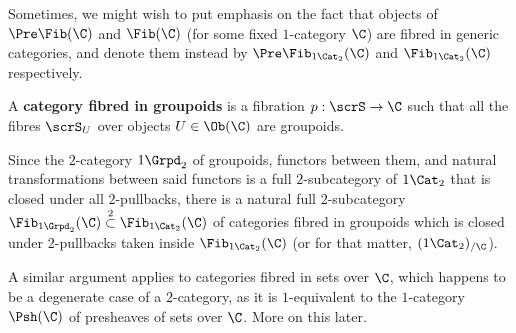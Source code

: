             \begin{convention}
                Sometimes, we might wish to put emphasis on the fact that objects of $\Pre\Fib(\C)$ and $\Fib(\C)$ (for some fixed $1$-category $\C$) are fibred in generic categories, and denote them instead by $\Pre\Fib_{1\-\Cat_2}(\C)$ and $\Fib_{1\-\Cat_2}(\C)$ respectively.
            \end{convention}
            \begin{definition} \label{def: categories_fibred_in_groupoids}
                A \textbf{category fibred in groupoids} is a fibration $p: \scrS \to \C$ such that all the fibres $\scrS_U$ over objects $U \in \Ob(\C)$ are groupoids. 
            \end{definition}
            \begin{remark}
                Since the $2$-category $1\-\Grpd_2$ of groupoids, functors between them, and natural transformations between said functors is a full $2$-subcategory of $1\-\Cat_2$ that is closed under all $2$-pullbacks, there is a natural full $2$-subcategory $\Fib_{1\-\Grpd_2}(\C) \overset{2}{\subset} \Fib_{1\-\Cat_2}(\C)$ of categories fibred in groupoids which is closed under $2$-pullbacks taken inside $\Fib_{1\-\Cat_2}(\C)$ (or for that matter, $(1\-\Cat_2)_{/\C}$).
                
                A similar argument applies to categories fibred in sets over $\C$, which happens to be a degenerate case of a $2$-category, as it is $1$-equivalent to the $1$-category $\Psh(\C)$ of presheaves of sets over $\C$. More on this later. 
            \end{remark}
            
